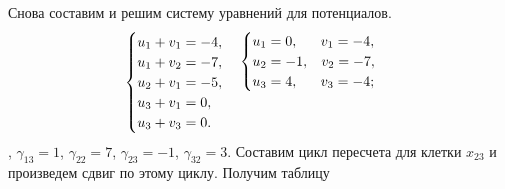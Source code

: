 Снова составим и решим систему уравнений для потенциалов.
$$
\begin{cases}
   u_1 + v_1 = -4,\\
   u_1 + v_2 = -7,\\
   u_2 + v_1 = -5,\\
   u_3 + v_1 = 0,\\
   u_3 + v_3 = 0.
\end{cases}
\raisebox{1.5em}{$
	\begin{cases}
		u_1 = 0,\hspace{3.7ex} v_1 = -4,\\
		u_2 = -1,\hspace{2ex} v_2 = -7,\\
		u_3 = 4,\hspace{3.7ex} v_3 = -4;
	\end{cases}$
}
$$
, $\gamma_{13}=1$, $\gamma_{22}=7$, $\gamma_{23}=-1$, $\gamma_{32}=3$. Составим цикл пересчета для клетки $x_{23}$ и произведем сдвиг по этому циклу. Получим таблицу
